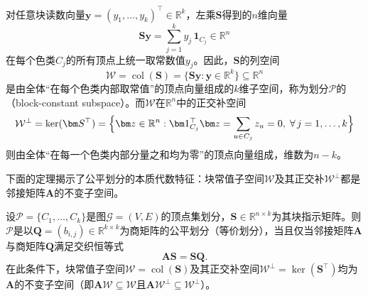 对任意块读数向量$\bm y=(y_1,\ldots,y_k)^\top\in\mathbb R^k$，左乘$\bm S$得到的$n$维向量
\[
\bm S\bm y=\sum_{j=1}^k y_j\,\bm 1_{C_j}\in\mathbb R^n
\]
在每个色类$C_j$的所有顶点上统一取常数值$y_j$。因此，$\bm S$的列空间
\[
\mathcal W=\operatorname{col}(\bm S)=\bigl\{\bm S\bm y:\bm y\in\mathbb R^k\bigr\}\subseteq\mathbb R^n
\]
是由全体“在每个色类内部取常值”的顶点向量组成的$k$维子空间，称为划分$\mathcal P$的（block-constant subspace）。而$\mathcal W$在$\mathbb R^n$中的正交补空间
\[
\mathcal W^\perp
=\ker(\bm S^\top)
=\Bigl\{\bm z\in\mathbb R^n:\bm 1_{C_j}^\top\bm z=\sum_{u\in C_j}z_u=0,\;\forall\,j=1,\ldots,k\Bigr\}
\]
则由全体“在每一个色类内部分量之和均为零”的顶点向量组成，维数为$n-k$。

下面的定理揭示了公平划分的本质代数特征：块常值子空间$\mathcal W$及其正交补$\mathcal W^\perp$都是邻接矩阵$\bm A$的不变子空间。

\begin{theorem}[商矩阵的交织恒等式]
\label{thm:quotient-intertwining}
设$\mathcal P=\{C_1,\ldots,C_k\}$是图$\mathcal G=(V,E)$的顶点集划分，$\bm S\in\mathbb R^{n\times k}$为其块指示矩阵。则$\mathcal P$是以$\bm Q=(b_{i,j})\in\mathbb R^{k\times k}$为商矩阵的公平划分（等价划分），当且仅当邻接矩阵$\bm A$与商矩阵$\bm Q$满足交织恒等式
\begin{equation}
\bm A\bm S=\bm S\bm Q.
\label{eq:adjacency-quotient-intertwining}
\end{equation}
在此条件下，块常值子空间$\mathcal W=\operatorname{col}(\bm S)$及其正交补空间$\mathcal W^\perp=\ker(\bm S^\top)$均为$\bm A$的不变子空间（即$\bm A\mathcal W\subseteq\mathcal W$且$\bm A\mathcal W^\perp\subseteq\mathcal W^\perp$）。
\end{theorem}

